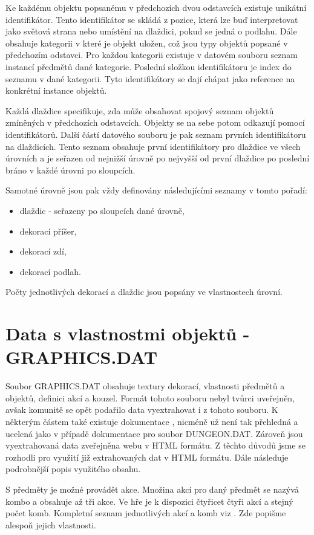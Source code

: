 Ke každému objektu popsanému v předchozích dvou odstavcích existuje unikátní identifikátor. 
Tento identifikátor se skládá z pozice, která lze buď interpretovat jako světová strana nebo 
umístění na dlaždici, pokud se jedná o podlahu. Dále obsahuje kategorii v které je objekt
uložen, což jsou typy objektů popsané v předchozím odstavci. Pro každou kategorii existuje
v datovém souboru seznam instancí předmětů dané kategorie. Poslední složkou identifikátoru 
je index do seznamu v dané kategorii. Tyto identifikátory se dají chápat jako reference 
na konkrétní instance objektů.

Každá dlaždice specifikuje, zda může obsahovat spojový seznam objektů zmíněných v předchozích odstavcích. 
Objekty se na sebe potom odkazují pomocí identifikátorů. Další částí datového souboru je pak 
seznam prvních identifikátoru na dlaždicích. Tento seznam obsahuje první identifikátory pro dlaždice
ve všech úrovních a je seřazen od nejnižší úrovně po nejvyšší od první dlaždice po poslední bráno  
v každé úrovni po sloupcích.

Samotné úrovně jsou pak vždy definovány následujícími seznamy v tomto pořadí:
\begin{itemize}
\item dlaždic - seřazeny po sloupcích dané úrovně,
\item dekorací příšer,
\item dekorací zdí, 
\item dekorací podlah.
\end{itemize}
Počty jednotlivých dekorací a dlaždic jsou popsány ve vlastnostech úrovní.

\section{Data s vlastnostmi objektů - GRAPHICS.DAT}
Soubor GRAPHICS.DAT obsahuje textury dekorací, vlastnosti předmětů a objektů, definici akcí a kouzel.
Formát tohoto souboru nebyl tvůrci uveřejněn, avšak komunitě se opět podařilo data
vyextrahovat i z tohoto souboru. K některým částem také existuje dokumentace \citet{graphicdokumentace}, 
nicméně už není tak přehledná a ucelená jako v případě dokumentace pro soubor DUNGEON.DAT. Zároveň 
jsou vyextrahovaná data zveřejněna webu v HTML formátu. Z těchto důvodů jsme se rozhodli 
pro využití již extrahovaných dat v HTML formátu. Dále následuje podrobnější popis využitého obsahu.

S předměty je možné provádět akce. Množina akcí pro daný předmět se nazývá kombo a obsahuje 
až tři akce. Ve hře je k dispozici čtyřicet čtyři akcí a stejný počet komb. Kompletní seznam jednotlivých
akcí a komb viz . Zde popišme alespoň jejich vlastnosti.

